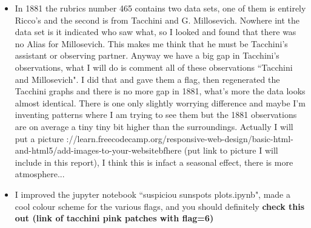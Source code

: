 \documentclass[12pt]{article}
\begin{document}
\begin{itemize}
\begin{itemize}
    \item In 1881 the rubrics number 465 contains two data sets, one of them is entirely Ricco's and the second is from Tacchini and G. Millosevich. Nowhere int the data set is it indicated who saw what, so I looked and found that there was no Alias for Millosevich. This makes me think that he must be Tacchini's assistant or observing partner. Anyway we have a big gap in Tacchini's observations, what I will do is comment all of these observations ``Tacchini and Millosevich". I did that and gave them a flag, then regenerated the Tacchini graphs and there is no more gap in 1881, what's more the data looks almost identical. There is one only slightly worrying difference and maybe I'm inventing patterns where I am trying to see them but the 1881 observations are on average a tiny tiny bit higher than the surroundings. Actually I will put a picture \texthttps://learn.freecodecamp.org/responsive-web-design/basic-html-and-html5/add-images-to-your-websitebf{here (put link to picture I will include in this report)}, I think this is infact a seasonal effect, there is more atmosphere...
    \item I improved the jupyter notebook ``suspiciou sunspots plots.ipynb", made a cool colour scheme for the various flags, and you should definitely \textbf{check this out (link of tacchini pink patches with flag=6)}
    \end{itemize}
    

\end{itemize}
\end{document}
